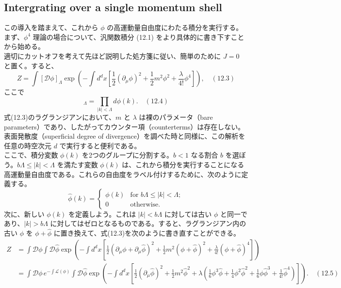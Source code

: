 \documentclass[uplatex,dvipdfmx]{jsarticle}
\begin{document}
\subsection{Intergrating over a single momentum shell}
この導入を踏まえて、これから $\phi$ の高運動量自由度にわたる積分を実行する。まず、$\phi^4$ 理論の場合について、汎関数積分 (12.1) をより具体的に書き下すことから始める。\\
適切にカットオフを考えて先ほど説明した処方箋に従い、簡単のために $J=0$ と置く。すると、
\begin{equation}
    Z = \int [\mathcal{D}\phi]_\Lambda \exp\left( - \int d^d x \left[ \frac{1}{2}(\partial_\mu \phi)^2 + \frac{1}{2}m^2 \phi^2 + \frac{\lambda}{4!} \phi^4 \right] \right), \quad (12.3)
\end{equation}
ここで
\begin{equation}
    [\mathcal{D}\phi]_\Lambda = \prod_{|k| < \Lambda} d\phi(k). \quad (12.4)
\end{equation}
式(12.3)のラグランジアンにおいて、$m$ と $\lambda$ は裸のパラメータ（bare parameters）であり、したがってカウンター項（counterterms）は存在しない。表面発散度（superficial degree of divergence）を調べた時と同様に、この解析を任意の時空次元 $d$ で実行すると便利である。\\
ここで、積分変数 $\phi(k)$ を2つのグループに分割する。$b < 1$ なる割合 $b$ を選ぼう。$b\Lambda \le |k| < \Lambda$ を満たす変数 $\phi(k)$ は、これから積分を実行することになる高運動量自由度である。これらの自由度をラベル付けするために、次のように定義する。
\begin{equation}
    \hat{\phi}(k) = \begin{cases} \phi(k) & \text{for } b\Lambda \le |k| < \Lambda ; \\ 0 & \text{otherwise.} \end{cases}
\end{equation}
次に、新しい $\phi(k)$ を定義しよう。これは $|k| < b\Lambda$ に対しては古い $\phi$ と同一であり、$|k| > b\Lambda$ に対してはゼロとなるものである。すると、ラグランジアン内の古い $\phi$ を $\phi + \hat{\phi}$ に置き換えて、式(12.3)を次のように書き直すことができる。
\begin{equation}
    \begin{split}
    Z &= \int \mathcal{D}\phi \int \mathcal{D}\hat{\phi} \exp\left( - \int d^d x \left[ \frac{1}{2}(\partial_\mu \phi + \partial_\mu \hat{\phi})^2 + \frac{1}{2}m^2 (\phi + \hat{\phi})^2 + \frac{\lambda}{4!} (\phi + \hat{\phi})^4 \right] \right) \\
    &= \int \mathcal{D}\phi \, e^{-\int \mathcal{L}(\phi)} \int \mathcal{D}\hat{\phi} \exp\left( - \int d^d x \left[ \frac{1}{2}(\partial_\mu \hat{\phi})^2 + \frac{1}{2}m^2 \hat{\phi}^2 + \lambda\left( \frac{1}{6} \phi^3 \hat{\phi} + \frac{1}{4} \phi^2 \hat{\phi}^2 + \frac{1}{6} \phi \hat{\phi}^3 + \frac{1}{4!} \hat{\phi}^4 \right) \right] \right). \quad (12.5)
    \end{split}
\end{equation}
\end{document}
